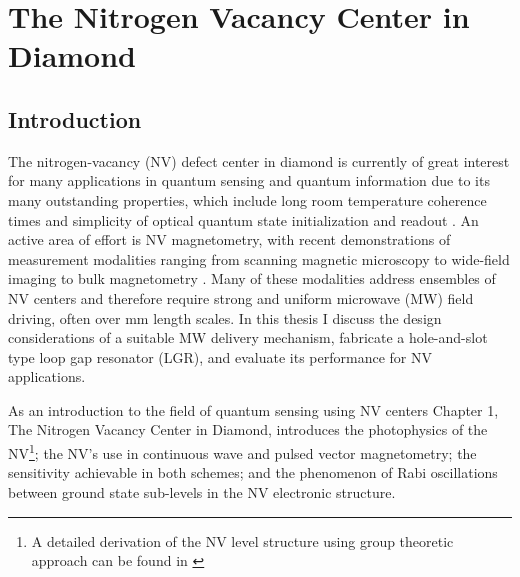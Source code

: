 
\chapter{The Nitrogen Vacancy Center in Diamond}

\section{Introduction}

The nitrogen-vacancy (NV) defect center in diamond is currently of great interest for many applications in quantum sensing \cite{taylor2008high,balasubramanian2008nanoscale,dolde2011electric,neumann2013high, degen2008scanning,hodges2013timekeeping} and quantum information \cite{childress2013diamond,gaebel2006room,dutt2007quantum} due to its many outstanding properties, which include long room temperature coherence times \cite{balasubramanian2008nanoscale} and simplicity of optical quantum state initialization and readout \cite{schirhagl2014nitrogen,jensen2017magnetometry}. An active area of effort is NV magnetometry, with recent demonstrations of measurement modalities ranging from scanning magnetic microscopy \cite{degen2008scanning} to wide-field imaging \cite{pham2011magnetic} to bulk magnetometry \cite{wolf2015subpicotesla}. Many of these modalities address ensembles of NV centers and therefore require strong and uniform microwave (MW) field driving, often over mm length scales. In this thesis I discuss the design considerations of a suitable MW delivery mechanism, fabricate a hole-and-slot type loop gap resonator (LGR), and evaluate its performance for NV applications. 

As an introduction to the field of quantum sensing using NV centers Chapter 1, The Nitrogen Vacancy Center in Diamond, introduces the photophysics of the NV\footnote{A detailed derivation of the NV level structure using group theoretic approach can be found in \cite{doherty2012theory, doherty2013thenitrogen, maze2011properties} }; the NV's use in continuous wave and pulsed vector magnetometry; the sensitivity achievable in both schemes; and the phenomenon of Rabi oscillations between ground state sub-levels in the NV electronic structure.

